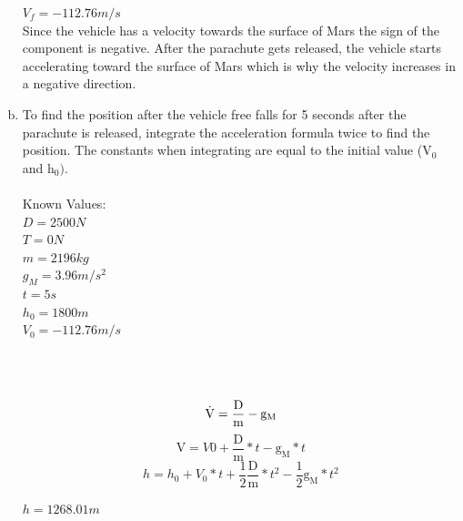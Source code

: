 \begin{enumerate}[a.]
$V_f=-112.76 m/s$\\

Since the vehicle has a velocity towards the surface of Mars the sign of the component is negative. After the parachute gets released, the vehicle starts accelerating toward the surface of Mars which is why the velocity increases in a negative direction.

\item
To find the position after the vehicle free falls for 5 seconds after the parachute is released, integrate the acceleration formula twice to find the position. The constants when integrating are equal to the initial value (${\mathrm{V_0}}$ and $\mathrm{h_0})$.
\\\\
Known Values:
\\
$D=2500N$\\
$T=0N$\\
$m=2196kg$\\
$g_M = 3.96m/{s^2}$\\
$t = 5s$\\
$h_0=1800m$\\
$V_0=-112.76m/s$\\\\\\\\
\begin{equation}
\dot{\mathrm{V}}=\frac{\mathrm{D}}{\mathrm{m}}-\mathrm{g_M}\\
\end{equation}
\begin{equation}
{\mathrm{V}}=V0+\frac{\mathrm{D}}{\mathrm{m}}*t-\mathrm{g_M}*t
\end{equation}
\begin{equation}
h=h_0+V_0*t+\frac{1}{2}\frac{\mathrm{D}}{\mathrm{m}}*t^2-\frac{1}{2}\mathrm{g_M}*t^2
\end{equation}

$h=1268.01m$


\end{enumerate}
